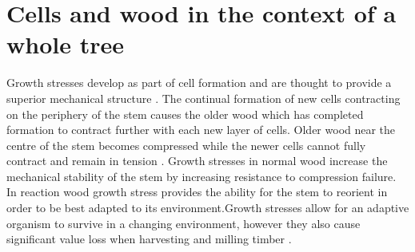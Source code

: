 \section{Cells and wood in the context of a whole tree}
Growth stresses develop as part of cell formation and are thought to provide a
superior mechanical structure \cite{mattheck1997wood}. The continual formation of new cells contracting
on the periphery of the stem causes the older wood which has completed formation
to contract further with each new layer of cells. Older wood near the centre
of the stem becomes compressed while the newer cells cannot fully contract and
remain in tension \cite{Archer_1987}.
Growth stresses in normal wood increase the mechanical stability of the stem by increasing resistance to compression failure. In reaction wood growth stress provides the ability for the stem to reorient in
order to be best adapted to its environment.Growth stresses allow for an adaptive organism to survive in a changing environment,
however they also cause significant value loss when harvesting and
milling timber \cite{kubler_1987}.
